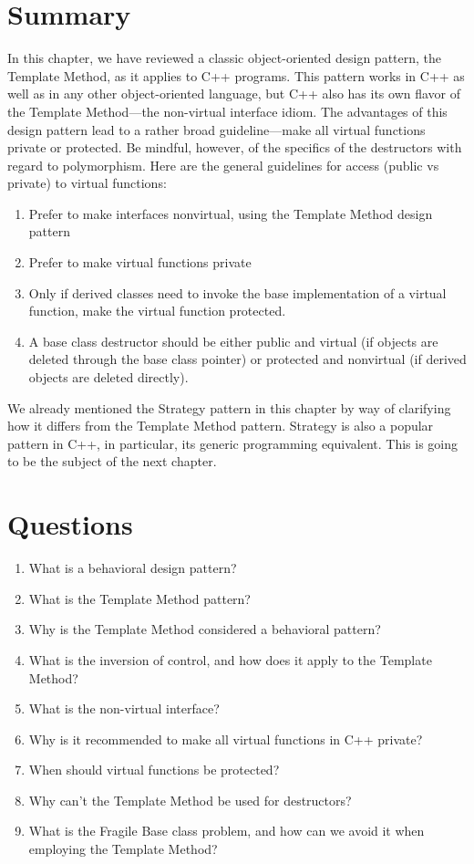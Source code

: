 \section{Summary}

In this chapter, we have reviewed a classic object-oriented design pattern, the Template Method, as it applies to C++ programs. This pattern works in C++ as well as in any other object-oriented language, but C++ also has its own flavor of the Template Method---the non-virtual interface idiom. The advantages of this design pattern lead to a rather broad guideline---make all virtual functions private or protected. Be mindful, however, of the specifics of the destructors with regard to polymorphism. Here are the general guidelines for access (public vs private) to virtual functions:

\begin{enumerate}
\item
  Prefer to make interfaces nonvirtual, using the Template Method design pattern
\item
  Prefer to make virtual functions private
\item
  Only if derived classes need to invoke the base implementation of a virtual function, make the virtual function protected.
\item
  A base class destructor should be either public and virtual (if objects are deleted through the base class pointer) or protected and nonvirtual (if derived objects are deleted directly).
\end{enumerate}

We already mentioned the Strategy pattern in this chapter by way of clarifying how it differs from the Template Method pattern. Strategy is also a popular pattern in C++, in particular, its generic programming equivalent. This is going to be the subject of the next chapter.

\section{Questions}

\begin{enumerate}
\item
  What is a behavioral design pattern?
\item
  What is the Template Method pattern?
\item
  Why is the Template Method considered a behavioral pattern?
\item
  What is the inversion of control, and how does it apply to the Template Method?
\item
  What is the non-virtual interface?
\item
  Why is it recommended to make all virtual functions in C++ private?
\item
  When should virtual functions be protected?
\item
  Why can't the Template Method be used for destructors?
\item
  What is the Fragile Base class problem, and how can we avoid it when employing the Template Method?
\end{enumerate}



